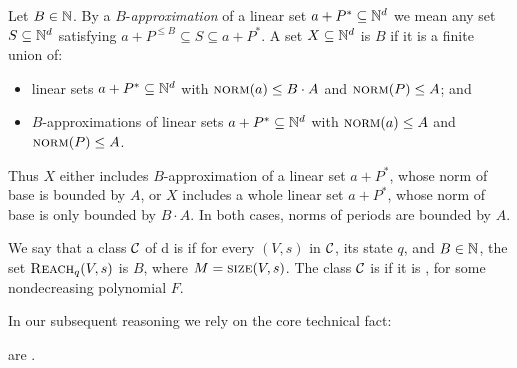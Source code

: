 
Let $B\in \mathbb{N}$.
By a $B$-\emph{approximation}
of a linear set $a + P^*\subseteq \mathbb{N}^d$ we mean any set $S\subseteq \mathbb{N}^d$ satisfying 
$
a + P^{\leq B} \subseteq S \subseteq a+P^*.
$
%
A set $X\subseteq \mathbb{N}^d$ is \emph{ {$B$}}
if it is a finite union of:

\begin{itemize}
  \item linear sets $a + P^* \subseteq \mathbb{N}^d$ with $\textsc{norm}(a) \leq B \cdot A$ and
  $\textsc{norm}(P) \leq A$; and
  \item $B$-approximations of linear sets $a + P^* \subseteq \mathbb{N}^d$ with $\textsc{norm}(a) \leq A$ and
  $\textsc{norm}(P) \leq A$.
\end{itemize}
%

\noindent
Thus $X$ either includes 
$B$-approximation of a linear set $a+P^*$, whose norm of base is bounded by $A$,
or $X$ includes 
a whole linear set $a+P^*$, whose norm of base is only bounded by $B\cdot A$.
In both cases, norms of periods are bounded by $A$.

We say that a class $\mathcal{C}$ of \parvass d is \emph{} 
if for every \vass $(V, s)$ in $\mathcal{C}$, its state $q$,
and $B\in\mathbb{N}$,
the set $\textsc{Reach}_q(V,s)$ is  {$B$}, where $M=\textsc{size}(V,s)$.
The class $\mathcal{C}$ is \emph{\sandwich} if it is , for some nondecreasing 
polynomial $F$.
%
%




In our subsequent reasoning we rely on the core technical fact:
%  
\begin{lemma}\label{lem:2vass-sandwich}
\dvass are \sandwich.
\end{lemma}

